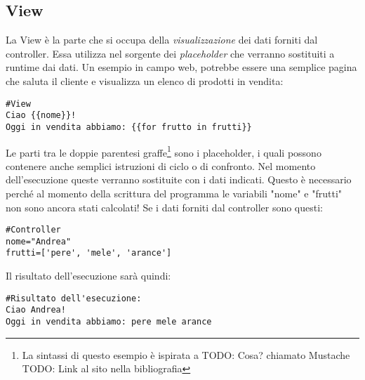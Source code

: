\subsection{View}
La View è la parte che si occupa della \emph{visualizzazione} dei dati forniti dal controller. Essa utilizza nel sorgente dei \emph{placeholder} che verranno sostituiti a runtime dai dati.
Un esempio in campo web, potrebbe essere una semplice pagina che saluta il cliente e visualizza un elenco di prodotti in vendita:
\begin{verbatim}
#View
Ciao {{nome}}!
Oggi in vendita abbiamo: {{for frutto in frutti}}
\end{verbatim}
Le parti tra le doppie parentesi graffe\footnote{La sintassi di questo esempio è ispirata a TODO: Cosa? chiamato Mustache TODO: Link al sito nella bibliografia} sono i placeholder, i quali possono contenere anche semplici istruzioni di ciclo o di confronto. Nel momento dell'esecuzione queste verranno sostituite con i dati indicati. Questo è necessario perché al momento della scrittura del programma le variabili "nome" e "frutti" non sono ancora stati calcolati!
Se i dati forniti dal controller sono questi:
\begin{lstlisting}
#Controller
nome="Andrea"
frutti=['pere', 'mele', 'arance']
\end{lstlisting}
Il risultato dell'esecuzione sarà quindi:
\begin{verbatim}
#Risultato dell'esecuzione:
Ciao Andrea!
Oggi in vendita abbiamo: pere mele arance
\end{verbatim}







